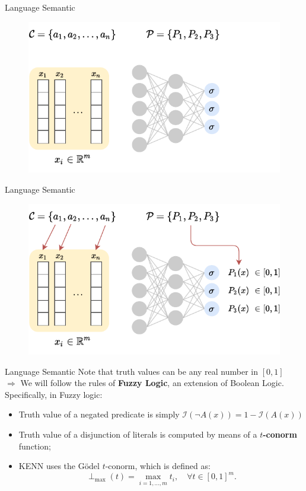 \documentclass{beamer}
\begin{document}
\begin{frame}{Language Semantic}
			\begin{figure}
		\centering
		\includegraphics[width=\linewidth]{images/interpretation_intuition0.pdf}
	\end{figure}
	
\end{frame}
\begin{frame}{Language Semantic}
	\begin{figure}
		\centering
		\includegraphics[width=\linewidth]{images/interpretation_intuition1.pdf}
	\end{figure}
\end{frame}

\begin{frame}{Language Semantic}
	 Note that truth values can be any real number in $[0,1]$\\ $  \Rightarrow$ We will follow the rules of \textbf{Fuzzy Logic}, an extension of Boolean Logic. Specifically, in Fuzzy logic:
	\begin{itemize}
		\pause
		\item Truth value of a negated predicate is simply $\mathcal{I}(\neg A(x)) = 1 - \mathcal{I}(A(x))$
		\pause
		\item Truth value of a disjunction of literals is computed by means of a \textbf{$t$-conorm} function;
		\pause
		\item KENN uses the Gödel $t$-conorm, which is defined as:
		\begin{equation*}
		\perp_{\text{max}}(t) = \underset{i=1,\dots,m}{\operatorname{max}} t_i, \quad \forall t\in [0,1]^m.
		\end{equation*}
	\end{itemize}	
\end{frame}
\end{document}
